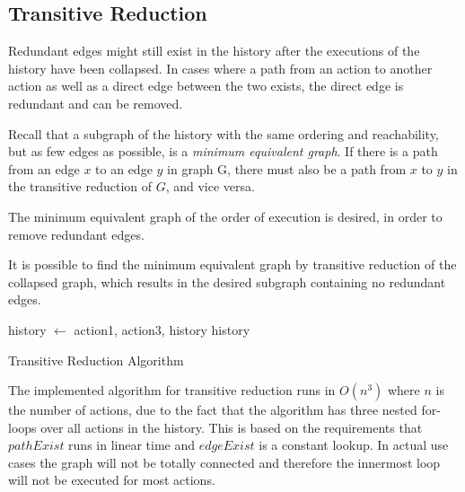     
	\subsection{Transitive Reduction}
	
	\newpar Redundant edges might still exist in the history after the executions of the history have been collapsed. 
	In cases where a path from an action to another action as well as a direct edge between the two exists, the direct edge is redundant and can be removed. 
	
	\newpar Recall that a subgraph of the history with the same ordering and reachability, but as few edges as possible, is a \textit{minimum equivalent graph}. If there is a path from an edge $x$ to an edge $y$ in graph G, there must also be a path from $x$ to $y$ in the transitive reduction of $G$, and vice versa. 
	
	The minimum equivalent graph of the order of execution is desired, in order to remove redundant edges. 
	
	It is possible to find the minimum equivalent graph by transitive reduction of the collapsed graph, which results in the desired subgraph containing no redundant edges.
	
	\begin{algorithm}
		\begin{algorithmic}
										\State history $\leftarrow$  {action1, action3, history}
									\EndIf
								\EndIf
							\EndFor
						\EndIf
					\EndFor
				\EndFor
			\State
			\Return history
			\EndFunction
		\end{algorithmic}
		\caption{Transitive Reduction Algorithm}
	\end{algorithm}
	
	\newpar The implemented algorithm for transitive reduction runs in $O(n^3)$ where $n$ is the number of actions, due to the fact that the algorithm has three nested for-loops over all actions in the history. This is based on the requirements that $pathExist$ runs in linear time and $edgeExist$ is a constant lookup. In actual use cases the graph will not be totally connected and therefore the innermost loop will not be executed for most actions.
	

